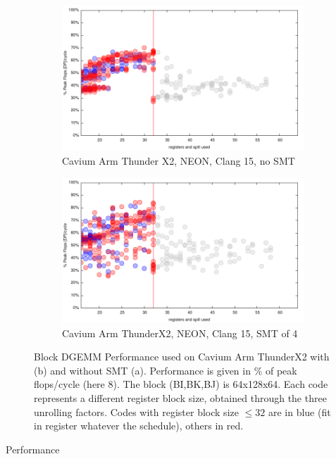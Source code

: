 \documentclass{article}
\begin{document}
\begin{figure}[h!]
  \begin{subfigure}[h]{0.45\textwidth}
  \includegraphics[width=\textwidth]{../benches/gemm/arm-64x256x64/greedy.pdf}
  \caption{Cavium Arm Thunder X2, NEON, Clang 15, no SMT}
  \end{subfigure}
  \begin{subfigure}[h]{0.45\textwidth}  
\includegraphics[width=\textwidth]{../benches/gemm/arm-64x256x64/openmp.pdf}
  \caption{Cavium Arm ThunderX2, NEON, Clang 15, SMT of 4}
  \end{subfigure}
    \caption{Block DGEMM Performance used on Cavium Arm ThunderX2 with (b) and without SMT (a). Performance is given in \% of peak flops/cycle (here 8). The block (BI,BK,BJ) is 64x128x64. Each code represents a different register block size, obtained through the three unrolling factors. Codes with register block size $\leq 32$ are in blue (fit in register whatever the schedule), others in red. \label{fig:arm}}
\end{figure}
Performance 
\end{document}
